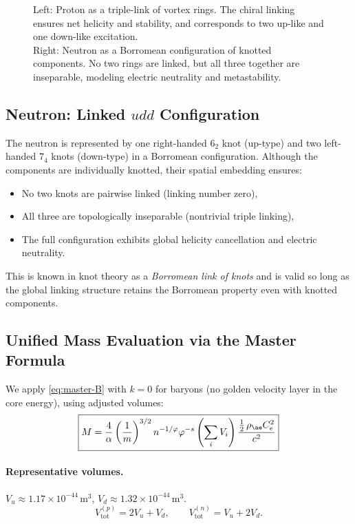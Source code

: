 \documentclass[12pt]{article}
\begin{document}
\begin{figure}[H]
\begin{minipage}{0.25\textwidth}
\end{minipage}
    \caption{Left: Proton as a triple-link of vortex rings. The chiral linking ensures net helicity and stability, and corresponds to two up-like and one down-like excitation.\\
      Right: Neutron as a Borromean configuration of knotted components. No two rings are linked, but all three together are inseparable, modeling electric neutrality and metastability.}
\end{figure}

\subsection{Neutron: Linked \(udd\) Configuration}

The neutron is represented by one right-handed \( 6_2 \) knot (up-type) and two left-handed \( 7_4 \) knots (down-type) in a Borromean configuration. Although the components are individually knotted, their spatial embedding ensures:

\begin{itemize}
    \item No two knots are pairwise linked (linking number zero),
    \item All three are topologically inseparable (nontrivial triple linking),
    \item The full configuration exhibits global helicity cancellation and electric neutrality.
\end{itemize}

This is known in knot theory as a \emph{Borromean link of knots} and is valid so long as the global linking structure retains the Borromean property even with knotted components.


  \subsection{Unified Mass Evaluation via the Master Formula}
  We apply \eqref{eq:master-B} with \(k=0\) for baryons (no golden velocity layer in the core energy), using adjusted volumes:
  \begin{equation}
      \boxed{
          M = \frac{4}{\alpha} \left(\frac{1}{m}\right)^{3/2} n^{-1/\varphi} \varphi^{-s}
          \left(\sum_i V_i\right)
          \frac{\tfrac12\,\rho_{\ae} C_e^2}{c^2}
      }
  \end{equation}

  \paragraph{Representative volumes.}
  \(V_u \approx 1.17\times 10^{-44}\,\mathrm{m}^3\),
  \(V_d \approx 1.32\times 10^{-44}\,\mathrm{m}^3\).
  \[
      V_{\text{tot}}^{(p)}=2V_u+V_d,\qquad
      V_{\text{tot}}^{(n)}=V_u+2V_d.
  \]
\end{document}
